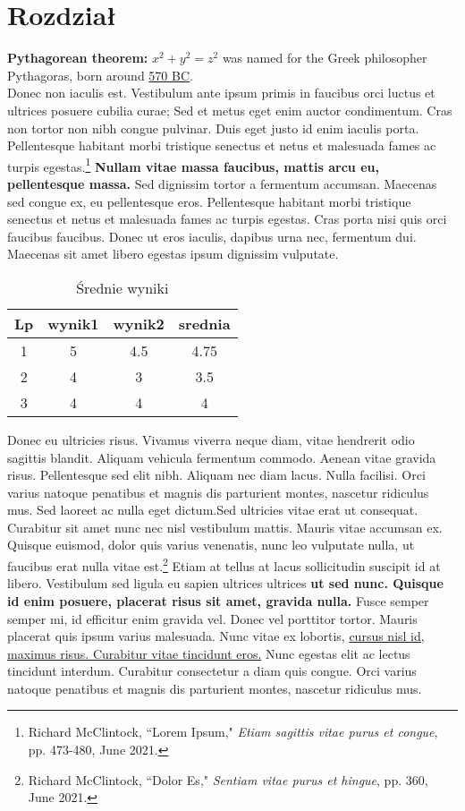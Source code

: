 \documentclass[12pt,a4paper]{article}
\begin{document}
	\section{Rozdział}
	\textbf{Pythagorean theorem:} \(x^2 + y^2 = z^2\) was named for the Greek philosopher Pythagoras, born around \underline{570 BC}.
	\\Donec non iaculis est. Vestibulum ante ipsum primis in faucibus orci luctus et ultrices posuere cubilia curae; Sed et metus eget enim auctor condimentum. Cras non tortor non nibh congue pulvinar. Duis eget justo id enim iaculis porta. Pellentesque habitant morbi tristique senectus et netus et malesuada fames ac turpis egestas.\footnote{Richard McClintock, ``Lorem Ipsum," \emph{Etiam sagittis vitae purus et congue}, pp. 473-480, June 2021.} \textbf{Nullam vitae massa faucibus, mattis arcu eu, pellentesque massa.} Sed dignissim tortor a fermentum accumsan. Maecenas sed congue ex, eu pellentesque eros. Pellentesque habitant morbi tristique senectus et netus et malesuada fames ac turpis egestas. Cras porta nisi quis orci faucibus faucibus. Donec ut eros iaculis, dapibus urna nec, fermentum dui. Maecenas sit amet libero egestas ipsum dignissim vulputate. 
	\begin{table}[H]
		\centering
		\begin{tabular}{||c c c c||} 
			\hline
			Lp & wynik1 & wynik2 & srednia \\ [0.5ex] 
			\hline\hline
			1 & 5 & 4.5 & 4.75 \\ 
			\hline
			2 & 4 & 3 & 3.5 \\
			\hline
			3 & 4 & 4 & 4 \\ [1ex] 
			\hline
		\end{tabular}
	\caption{Średnie wyniki}
	\label{table: SrednieWyniki}
	\end{table}
	Donec eu ultricies risus. Vivamus viverra neque diam, vitae hendrerit odio sagittis blandit. Aliquam vehicula fermentum commodo. Aenean vitae gravida risus. Pellentesque sed elit nibh. Aliquam nec diam lacus. Nulla facilisi. Orci varius natoque penatibus et magnis dis parturient montes, nascetur ridiculus mus. Sed laoreet ac nulla eget dictum.Sed ultricies vitae erat ut consequat. Curabitur sit amet nunc nec nisl vestibulum mattis. Mauris vitae accumsan ex. Quisque euismod, dolor quis varius venenatis, nunc leo vulputate nulla, ut faucibus erat nulla vitae est.\footnote{Richard McClintock, ``Dolor Es," \emph{Sentiam vitae purus et hingue}, pp. 360, June 2021.} Etiam at tellus at lacus sollicitudin suscipit id at libero. Vestibulum sed ligula eu sapien ultrices ultrices \textbf{ut sed nunc. Quisque id enim posuere, placerat risus sit amet, gravida nulla.} Fusce semper semper mi, id efficitur enim gravida vel. Donec vel porttitor tortor. Mauris placerat quis ipsum varius malesuada. Nunc vitae ex lobortis, \underline{cursus nisl id, maximus risus. Curabitur vitae tincidunt eros.} Nunc egestas elit ac lectus tincidunt interdum. Curabitur consectetur a diam quis congue. Orci varius natoque penatibus et magnis dis parturient montes, nascetur ridiculus mus. 
\end{document}
